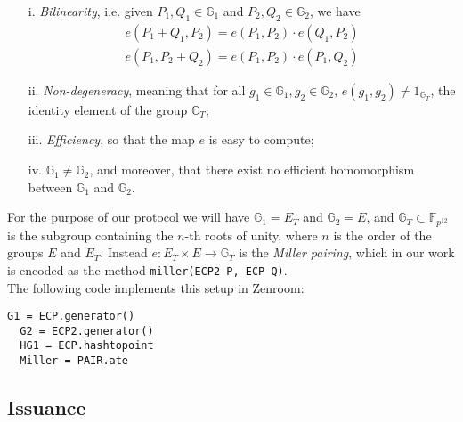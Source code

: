 \documentclass[conference]{IEEEtran}
\begin{document}
\begin{itemize}

\item [i.] \emph{Bilinearity}, i.e. given $P_1,Q_1\in\mathbb{G}_1$
  and $P_2,Q_2\in\mathbb{G}_2$, we have
  \begin{align*}
    e(P_1+Q_1,P_2) = e(P_1,P_2)\cdot e(Q_1,P_2) \\
    e(P_1,P_2+Q_2) = e(P_1,P_2)\cdot e(P_1,Q_2)
  \end{align*}

\item[ii.] \emph{Non-degeneracy}, meaning that for all
  $g_1\in\mathbb{G}_1, g_2\in\mathbb{G}_2$, $e(g_1,g_2)\ne
  1_{\mathbb{G}_T}$, the identity element of the group
  $\mathbb{G}_T$;

\item[iii.] \emph{ Efficiency}, so that the map $e$ is easy to
  compute;

\item[iv. ] $\mathbb{G}_1\ne \mathbb{G}_2$, and moreover, that
  there exist no efficient homomorphism between $\mathbb{G}_1$ and
  $\mathbb{G}_2$.

\end{itemize}

For the purpose of our protocol we will have $\mathbb{G}_1 = E_T$ and
$\mathbb{G}_2 = E$, and $\mathbb{G}_T\subset \mathbb{F}_{p^{12}}$ is
the subgroup containing the $n$-th roots of unity, where $n$ is the
order of the groups $E$ and $E_T$. Instead $e: E_T \times E\to
\mathbb{G}_T$ is the \emph{Miller pairing}, which in our work is
encoded as the method \verb!miller(ECP2 P, ECP Q)!. \\

The following code implements this setup in Zenroom:
\begin{lstlisting}[style=lua,caption={Setup}]
  G1 = ECP.generator()
  G2 = ECP2.generator()
  HG1 = ECP.hashtopoint
  Miller = PAIR.ate
\end{lstlisting}


\subsection{Issuance} \label{issuance}
\end{document}
